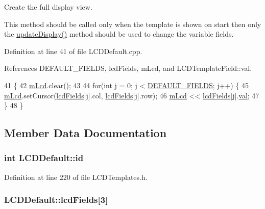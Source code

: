 Create the full display view. 

This method should be called only when the template is shown on start then only the \hyperlink{_meditech___chip_kit_control_panel_8pde_a5a7516a22f178c51ec37c6c8167aaf70}{update\-Display()} method should be used to change the variable fields. 

Definition at line 41 of file L\-C\-D\-Default.\-cpp.



References D\-E\-F\-A\-U\-L\-T\-\_\-\-F\-I\-E\-L\-D\-S, lcd\-Fields, m\-Lcd, and L\-C\-D\-Template\-Field\-::val.


\begin{DoxyCode}
41                                \{
42   \hyperlink{class_l_c_d_default_a9062ca1e44b8e0e5d360b00ce9218078}{mLcd}.clear();
43 
44   \textcolor{keywordflow}{for}(\textcolor{keywordtype}{int} j = 0; j < \hyperlink{_l_c_d_templates_8h_a5024eda36ea0cb0b3f89340f3bb0e146}{DEFAULT\_FIELDS}; j++) \{
45     \hyperlink{class_l_c_d_default_a9062ca1e44b8e0e5d360b00ce9218078}{mLcd}.setCursor(\hyperlink{class_l_c_d_default_a3f016f453e030ad7392a36b11418fff8}{lcdFields}[j].col, \hyperlink{class_l_c_d_default_a3f016f453e030ad7392a36b11418fff8}{lcdFields}[j].row);
46     \hyperlink{class_l_c_d_default_a9062ca1e44b8e0e5d360b00ce9218078}{mLcd} << \hyperlink{class_l_c_d_default_a3f016f453e030ad7392a36b11418fff8}{lcdFields}[j].\hyperlink{struct_l_c_d_template_field_a6eb7ce0547fc28ac3a2538f0fac3f117}{val};
47   \}
48 \}
\end{DoxyCode}


\subsection{Member Data Documentation}
\hypertarget{class_l_c_d_default_aa4b5f1f8f3e4778ab9dc50c6bcf1eac4}{
\subsubsection[{id}]{\setlength{\rightskip}{0pt plus 5cm}int L\-C\-D\-Default\-::id}}\label{class_l_c_d_default_aa4b5f1f8f3e4778ab9dc50c6bcf1eac4}


Definition at line 220 of file L\-C\-D\-Templates.\-h.

\hypertarget{class_l_c_d_default_a3f016f453e030ad7392a36b11418fff8}{
\subsubsection[{lcd\-Fields}]{ L\-C\-D\-Default\-::lcd\-Fields\mbox{[}3\mbox{]}}}\label{class_l_c_d_default_a3f016f453e030ad7392a36b11418fff8}


